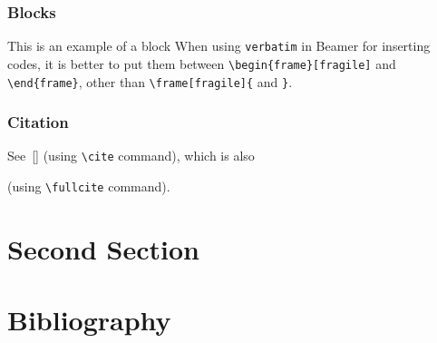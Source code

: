 \documentclass{beamer}
\theoremstyle{plain} %
\theoremstyle{example} %
\begin{document}
\begin{frame}[fragile]
	\frametitle{Blocks}
	\begin{block}{This is an example of a block}
	When using \verb+verbatim+ in Beamer for inserting codes, it is better to put them between \verb+\begin{frame}[fragile]+ and \verb+\end{frame}+, other than \verb+\frame[fragile]{+ and \verb+}+.
	\end{block}
\end{frame}

\begin{frame}[fragile]
	\frametitle{Citation}
	
	See~[\cite{Rosen2011}] (using \verb+\cite+ command), which is also
	
	
	(using \verb+\fullcite+ command).
	
\end{frame}

\section{Second Section}

\section{Bibliography}
\end{document}

